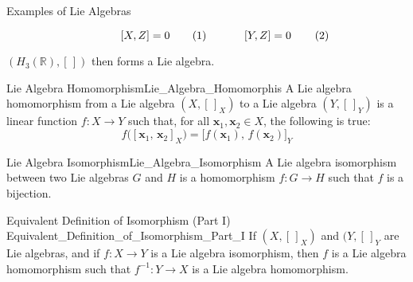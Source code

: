 \begin{lexample}{Examples of Lie Algebras}
\begin{subequations}
\begin{minipage}[b]{0.32\textwidth}
                \begin{equation}
                    [X,Z]=0
                \end{equation}
            \end{minipage}
            \hfill
            \begin{minipage}[b]{0.32\textwidth}
                \begin{equation}
                    [Y,Z]=0
                \end{equation}
            \end{minipage}
        \end{subequations}
        \par\vspace{2.5ex}
        $(H_{3}(\mathbb{R}),[\,])$ then forms a Lie algebra.
    \end{lexample}
    \begin{fdefinition}{Lie Algebra Homomorphism}{Lie_Algebra_Homomorphis}
        A Lie algebra homomorphism from a Lie algebra $(X,[\,]_{X})$ to a
        Lie algebra $(Y,[\,]_{Y})$ is a linear function
        $f:X\rightarrow{Y}$ such that, for all
        $\mathbf{x}_{1},\mathbf{x}_{2}\in{X}$, the following is true:
        \begin{equation}
            f\big([\mathbf{x}_{1},\,\mathbf{x}_{2}]_{X}\big)
            =\big[f(\mathbf{x}_{1}),\,f(\mathbf{x}_{2})\big]_{Y}
        \end{equation}
    \end{fdefinition}
    \begin{fdefinition}{Lie Algebra Isomorphism}{Lie_Algebra_Isomorphism}
        A Lie algebra isomorphism between two Lie algebras $G$ and $H$
        is a homomorphism $f:G\rightarrow{H}$ such that $f$ is a bijection.
    \end{fdefinition}
    \begin{ltheorem}{Equivalent Definition of Isomorphism (Part I)}
                    {Equivalent_Definition_of_Isomorphism_Part_I}
        If $(X,[\,]_{X})$ and $(Y,[\,]_{Y}$ are Lie algebras, and if
        $f:X\rightarrow{Y}$ is a Lie algebra isomorphism, then $f$ is
        a Lie algebra homomorphism such that
        $f^{\minus{1}}:Y\rightarrow{X}$ is a Lie algebra homomorphism.
    \end{ltheorem}
